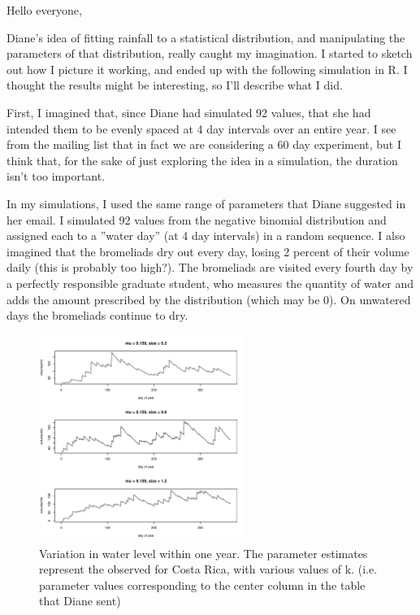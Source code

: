 \documentclass[10pt]{article}
\begin{document}
\begin{spacing}{1.5}

Hello everyone,

Diane's idea of fitting rainfall to a statistical distribution, and
manipulating the parameters of that distribution, really caught my
imagination.  I started to sketch out how I picture it working, and
ended up with the following simulation in R.  I thought the results
might be interesting, so I'll describe what I did.

First, I imagined that, since Diane had simulated 92 values, that she
had intended them to be evenly spaced at 4 day intervals over an
entire year.  I see from the mailing list that in fact we are
considering a 60 day experiment, but I think that, for the sake of
just exploring the idea in a simulation, the duration isn't too
important.

In my simulations, I used the same range of parameters that Diane
suggested in her email.  I simulated 92 values from the negative
binomial distribution and assigned each to a ''water day'' (at 4 day
intervals) in a random sequence.  I also imagined that the bromeliads
dry out every day, losing 2 percent of their volume daily (this is
probably too high?).  The bromeliads are visited every fourth day by a
perfectly responsible graduate student, who measures the quantity of
water and adds the amount prescribed by the distribution (which may
be 0).  On unwatered days the bromeliads continue to dry.

\begin{figure}
  \centering
  \includegraphics[width=0.6\textwidth]{singlebrom.pdf}
  \caption{Variation in water level within one year.  The parameter
    estimates represent the observed for Costa Rica, with various
    values of k.  (i.e. parameter values corresponding to the center
    column in the table that Diane sent)}
\end{figure}


\end{spacing}
\end{document}
